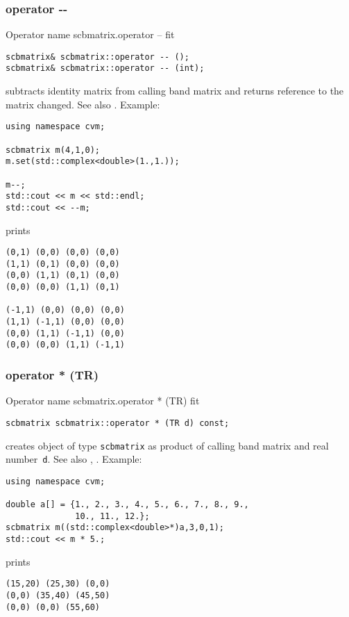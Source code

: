 \subsubsection{operator -{}-}
Operator%
\pdfdest name {scbmatrix.operator --} fit
\begin{verbatim}
scbmatrix& scbmatrix::operator -- ();
scbmatrix& scbmatrix::operator -- (int);
\end{verbatim}
subtracts identity matrix from  calling band matrix
and returns  reference to
the matrix changed.
See also .
Example:
\begin{Verbatim}
using namespace cvm;

scbmatrix m(4,1,0);
m.set(std::complex<double>(1.,1.));

m--;
std::cout << m << std::endl;
std::cout << --m;
\end{Verbatim}
prints
\begin{Verbatim}
(0,1) (0,0) (0,0) (0,0)
(1,1) (0,1) (0,0) (0,0)
(0,0) (1,1) (0,1) (0,0)
(0,0) (0,0) (1,1) (0,1)

(-1,1) (0,0) (0,0) (0,0)
(1,1) (-1,1) (0,0) (0,0)
(0,0) (1,1) (-1,1) (0,0)
(0,0) (0,0) (1,1) (-1,1)
\end{Verbatim}
\newpage




\subsubsection{operator * (TR)}
Operator%
\pdfdest name {scbmatrix.operator * (TR)} fit
\begin{verbatim}
scbmatrix scbmatrix::operator * (TR d) const;
\end{verbatim}
creates  object of type \verb"scbmatrix" as  product of
 calling band matrix and  real number~\verb"d".
See also ,
.
Example:
\begin{Verbatim}
using namespace cvm;

double a[] = {1., 2., 3., 4., 5., 6., 7., 8., 9.,
              10., 11., 12.};
scbmatrix m((std::complex<double>*)a,3,0,1);
std::cout << m * 5.;
\end{Verbatim}
prints
\begin{Verbatim}
(15,20) (25,30) (0,0)
(0,0) (35,40) (45,50)
(0,0) (0,0) (55,60)
\end{Verbatim}
\newpage



